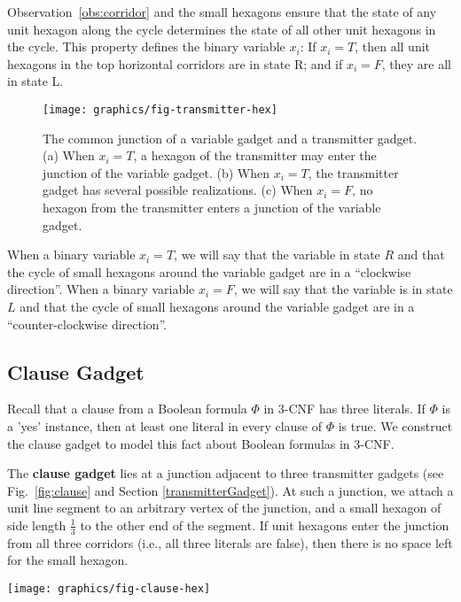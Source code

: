 Observation~\ref{obs:corridor} and the small hexagons ensure that the state of any unit hexagon along the cycle determines the state of all other unit hexagons in the cycle. 
This property defines the binary variable $x_i$: If $x_i=T$, then all unit hexagons in the top horizontal corridors are in state R; and if $x_i=F$, they are all in state L.
\begin{figure}[htbp]
	\centering
	\texttt{[image: graphics/fig-transmitter-hex]}
	\caption{The common junction of a variable gadget and a transmitter gadget.
(a) When $x_i=T$, a hexagon of the transmitter may enter the junction of the variable gadget.
(b) When $x_i=T$, the transmitter gadget has several possible realizations.
(c) When $x_i=F$, no hexagon from the transmitter enters a junction of the variable gadget.}
	\label{fig:transmitter}
\end{figure}
When a binary variable $x_i = T$, we will say that the variable in state $R$ and that the cycle of small hexagons around the variable gadget are in a ``clockwise direction''.
When a binary variable $x_i = F$, we will say that the variable is in state $L$ and that the cycle of small hexagons around the variable gadget are in a ``counter-clockwise direction''. 
\subsection{Clause Gadget}
Recall that a clause from a Boolean formula $\Phi$ in 3-CNF has three literals.  If $\Phi$ is a  'yes' instance, then at least one literal in every clause of $\Phi$ is true.  We construct the clause gadget to model this fact about Boolean formulas in 3-CNF.

The {\bf clause gadget} lies at a junction adjacent to three transmitter gadgets (see Fig.~\ref{fig:clause} and Section \ref{transmitterGadget}). 
At such a junction, we attach a unit line segment to an arbitrary vertex of the junction, and a small hexagon of side length $\frac{1}{3}$ to the other end of the segment. 
If unit hexagons enter the junction from all three corridors (i.e., all three literals are false), then there is no space left for the small hexagon. 

\begin{minipage}{\linewidth}
\begin{center}
\texttt{[image: graphics/fig-clause-hex]}
\label{fig:clause}
\end{center}
\end{minipage}


